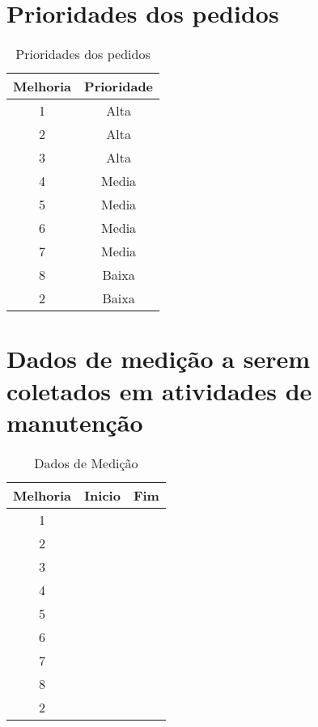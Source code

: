 \section{Prioridades dos pedidos}
\begin{table}[!htb]
	\caption[Prioridades]{Prioridades dos pedidos}
	\label{tab:prioridades}
	\centering
	\begin{tabular}{c|c}
		Melhoria & Prioridade 	\\ \hline
		1    & Alta   	\\
    2    & Alta		\\
		3    & Alta		\\
    4    & Media		\\
    5    & Media		\\
    6    & Media		\\
    7    & Media		\\
    8    & Baixa		\\
    2    & Baixa		\\
	\end{tabular}
\end{table}
\section{Dados de medição a serem coletados em atividades de manutenção}
\begin{table}[!htb]
	\caption[Medicao]{Dados de Medição}
	\label{tab:Medicao}
	\centering
	\begin{tabular}{c|c|c}
		Melhoria & Inicio & Fim 	\\ \hline
		1    &  & \\
    2    & 	&	\\
		3    &	&	\\
    4    &  &	\\
    5    & 	&	\\
    6    & 	&	\\
    7    & 	&	\\
    8    & 	&	\\
    2    & 	&	\\
	\end{tabular}
\end{table}
